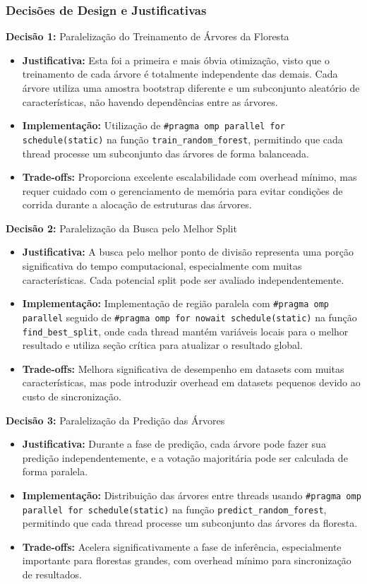 \documentclass[a4paper,11pt]{article}
\begin{document}
\subsubsection{Decisões de Design e Justificativas}

\textbf{Decisão 1:} Paralelização do Treinamento de Árvores da Floresta
\begin{itemize}
    \item \textbf{Justificativa:} Esta foi a primeira e mais óbvia otimização, visto que o treinamento de cada árvore é totalmente independente das demais. Cada árvore utiliza uma amostra bootstrap diferente e um subconjunto aleatório de características, não havendo dependências entre as árvores.
    \item \textbf{Implementação:} Utilização de \texttt{\#pragma omp parallel for schedule(static)} na função \texttt{train\_random\_forest}, permitindo que cada thread processe um subconjunto das árvores de forma balanceada.
    \item \textbf{Trade-offs:} Proporciona excelente escalabilidade com overhead mínimo, mas requer cuidado com o gerenciamento de memória para evitar condições de corrida durante a alocação de estruturas das árvores.
\end{itemize}

\textbf{Decisão 2:} Paralelização da Busca pelo Melhor Split
\begin{itemize}
    \item \textbf{Justificativa:} A busca pelo melhor ponto de divisão representa uma porção significativa do tempo computacional, especialmente com muitas características. Cada potencial split pode ser avaliado independentemente.
    \item \textbf{Implementação:} Implementação de região paralela com \texttt{\#pragma omp parallel} seguido de \texttt{\#pragma omp for nowait schedule(static)} na função \texttt{find\_best\_split}, onde cada thread mantém variáveis locais para o melhor resultado e utiliza seção crítica para atualizar o resultado global.
    \item \textbf{Trade-offs:} Melhora significativa de desempenho em datasets com muitas características, mas pode introduzir overhead em datasets pequenos devido ao custo de sincronização.
\end{itemize}

\textbf{Decisão 3:} Paralelização da Predição das Árvores
\begin{itemize}
    \item \textbf{Justificativa:} Durante a fase de predição, cada árvore pode fazer sua predição independentemente, e a votação majoritária pode ser calculada de forma paralela.
    \item \textbf{Implementação:} Distribuição das árvores entre threads usando \texttt{\#pragma omp parallel for schedule(static)} na função \texttt{predict\_random\_forest}, permitindo que cada thread processe um subconjunto das árvores da floresta.
    \item \textbf{Trade-offs:} Acelera significativamente a fase de inferência, especialmente importante para florestas grandes, com overhead mínimo para sincronização de resultados.
\end{itemize}
\end{document}
